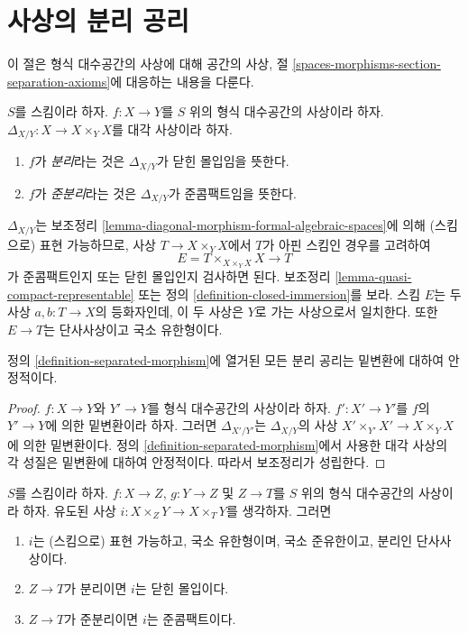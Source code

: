 \section{사상의 분리 공리}
\label{section-separation-axioms}

\noindent
이 절은 형식 대수공간의 사상에 대해 공간의 사상, 절
\ref{spaces-morphisms-section-separation-axioms}에 대응하는 내용을 다룬다.

\begin{definition}
\label{definition-separated-morphism}
$S$를 스킴이라 하자.
$f : X \to Y$를 $S$ 위의 형식 대수공간의 사상이라 하자.
$\Delta_{X/Y} : X \to X \times_Y X$를 대각 사상이라 하자.
\begin{enumerate}
\item $f$가 {\it 분리}라는 것은 $\Delta_{X/Y}$가 닫힌 몰입임을 뜻한다.
\item $f$가 {\it 준분리}라는 것은 $\Delta_{X/Y}$가 준콤팩트임을 뜻한다.
\end{enumerate}
\end{definition}

\noindent
$\Delta_{X/Y}$는 보조정리
\ref{lemma-diagonal-morphism-formal-algebraic-spaces}에 의해 (스킴으로)
표현 가능하므로, 사상 $T \to X \times_Y X$에서 $T$가 아핀 스킴인
경우를 고려하여
$$
E = T \times_{X \times_Y X} X \longrightarrow T
$$
가 준콤팩트인지 또는 닫힌 몰입인지 검사하면 된다. 보조정리
\ref{lemma-quasi-compact-representable} 또는 정의
\ref{definition-closed-immersion}를 보라. 스킴 $E$는 두 사상
$a, b : T \to X$의 등화자인데, 이 두 사상은 $Y$로 가는 사상으로서
일치한다. 또한 $E \to T$는 단사사상이고 국소 유한형이다.

\begin{lemma}
\label{lemma-base-change-separated}
정의 \ref{definition-separated-morphism}에 열거된 모든 분리 공리는
밑변환에 대하여 안정적이다.
\end{lemma}

\begin{proof}
$f : X \to Y$와 $Y' \to Y$를 형식 대수공간의 사상이라 하자.
$f' : X' \to Y'$를 $f$의 $Y' \to Y$에 의한 밑변환이라 하자. 그러면
$\Delta_{X'/Y'}$는 $\Delta_{X/Y}$의 사상
$X' \times_{Y'} X' \to X \times_Y X$에 의한
밑변환이다. 정의 \ref{definition-separated-morphism}에서 사용한 대각
사상의 각 성질은 밑변환에 대하여 안정적이다. 따라서 보조정리가 성립한다.
\end{proof}

\begin{lemma}
\label{lemma-fibre-product-after-map}
$S$를 스킴이라 하자. $f : X \to Z$, $g : Y \to Z$ 및 $Z \to T$를
$S$ 위의 형식 대수공간의 사상이라 하자. 유도된 사상
$i : X \times_Z Y \to X \times_T Y$를 생각하자. 그러면
\begin{enumerate}
\item $i$는 (스킴으로) 표현 가능하고, 국소 유한형이며, 국소 준유한이고,
분리인 단사사상이다.
\item $Z \to T$가 분리이면 $i$는 닫힌 몰입이다.
\item $Z \to T$가 준분리이면 $i$는 준콤팩트이다.
\end{enumerate}
\end{lemma}

